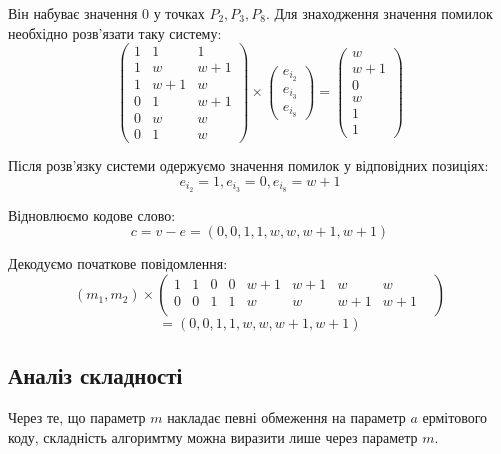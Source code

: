 \documentclass[a4paper,14pt,oneside]{extarticle}
\begin{document}
Він набуває значення $0$ у точках $P_2, P_3, P_8$. Для знаходження значення помилок необхідно розв'язати таку систему:
$$
\begin{pmatrix}
    1 & 1 & 1 \\
    1 & w & w + 1 \\
    1 & w + 1 & w \\
    0 & 1 & w + 1 \\
    0 & w & w \\
    0 & 1 & w 
\end{pmatrix} \times 
\begin{pmatrix}
    e_{i_2} \\
    e_{i_3} \\
    e_{i_8}
\end{pmatrix} = 
\begin{pmatrix}
    w \\
    w+1\\
    0\\
    w\\
    1\\
    1
\end{pmatrix}
$$

Після розв'язку системи одержуємо значення помилок у відповідних позиціях:
$$
e_{i_2} = 1, e_{i_3} = 0, e_{i_8} = w+1
$$

Відновлюємо кодове слово:
$$ c=v-e=(0, 0, 1, 1, w, w, w + 1, w + 1)$$

Декодуємо початкове повідомлення:
$$
(m_1, m_2)
\times
\begin{pmatrix}
    1 & 1 & 0 & 0 & w + 1 & w + 1 & w & w & \\
    0 & 0 & 1 & 1 & w & w & w + 1 & w + 1 & \\
\end{pmatrix}
$$
$$
= (0, 0, 1, 1, w, w, w + 1, w + 1)
$$


\subsection{Аналіз складності}
Через те, що параметр $m$ накладає певні обмеження на параметр $a$ ермітового коду, складність алгоримтму 
можна виразити лише через параметр $m$.
\end{document}
